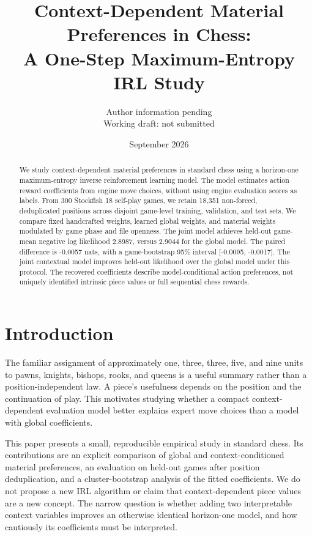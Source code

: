 \documentclass[11pt]{article}
\title{Context-Dependent Material Preferences in Chess:\\A One-Step Maximum-Entropy IRL Study}
\author{Author information pending\\\small Working draft: not submitted}
\date{September 2026}
\begin{document}
\maketitle
\begin{abstract}
We study context-dependent material preferences in standard chess using a horizon-one maximum-entropy inverse reinforcement learning model. The model estimates action reward coefficients from engine move choices, without using engine evaluation scores as labels. From 300 Stockfish 18 self-play games, we retain 18,351 non-forced, deduplicated positions across disjoint game-level training, validation, and test sets. We compare fixed handcrafted weights, learned global weights, and material weights modulated by game phase and file openness. The joint model achieves held-out game-mean negative log likelihood 2.8987, versus 2.9044 for the global model. The paired difference is -0.0057 nats, with a game-bootstrap 95\% interval [-0.0095, -0.0017]. The joint contextual model improves held-out likelihood over the global model under this protocol. The recovered coefficients describe model-conditional action preferences, not uniquely identified intrinsic piece values or full sequential chess rewards.
\end{abstract}

\section{Introduction}
The familiar assignment of approximately one, three, three, five, and nine units to pawns, knights, bishops, rooks, and queens is a useful summary rather than a position-independent law. A piece's usefulness depends on the position and the continuation of play. This motivates studying whether a compact context-dependent evaluation model better explains expert move choices than a model with global coefficients.

This paper presents a small, reproducible empirical study in standard chess. Its contributions are an explicit comparison of global and context-conditioned material preferences, an evaluation on held-out games after position deduplication, and a cluster-bootstrap analysis of the fitted coefficients. We do not propose a new IRL algorithm or claim that context-dependent piece values are a new concept. The narrow question is whether adding two interpretable context variables improves an otherwise identical horizon-one model, and how cautiously its coefficients must be interpreted.
\end{document}

